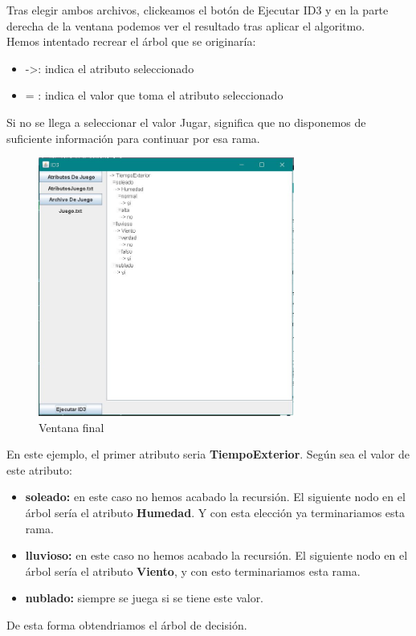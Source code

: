 \documentclass[12pt]{article}
\begin{document}
Tras elegir ambos archivos, clickeamos el botón de Ejecutar ID3 y en la parte derecha de la ventana podemos ver el resultado tras aplicar el algoritmo.\\
Hemos intentado recrear el árbol que se originaría:
\begin{itemize}
    \item -\textgreater : indica el atributo seleccionado
    \item = : indica el valor que toma el atributo seleccionado
\end{itemize}
Si no se llega a seleccionar el valor Jugar, significa que no disponemos de suficiente información para continuar por esa rama. 
\begin{figure}[H]
    \centering
    \includegraphics[width=0.75\textwidth]{final.JPG}
    \caption{Ventana final}
\end{figure}
En este ejemplo, el primer atributo seria \textbf{TiempoExterior}. Según sea el valor de este atributo:
\begin{itemize}
    \item \textbf{soleado:} en este caso no hemos acabado la recursión. El siguiente nodo en el árbol sería el atributo \textbf{Humedad}. Y con esta elección ya terminariamos esta rama.
    \item \textbf{lluvioso:} en este caso no hemos acabado la recursión. El siguiente nodo en el árbol sería el atributo \textbf{Viento}, y con esto terminariamos esta rama.
    \item \textbf{nublado:} siempre se juega si se tiene este valor.
\end{itemize}
De esta forma obtendriamos el árbol de decisión.
\end{document}
